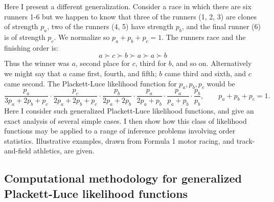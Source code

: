 \documentclass[article]{jss}
\begin{document}
Here I present a different generalization.  Consider a race in which
there are six runners 1-6 but we happen to know that three of the
runners (1, 2, 3) are clones of strength $p_a$, two of the runners (4, 5)
have strength $p_b$, and the final runner (6) is of strength $p_c$.
We normalize so $p_a+p_b+p_c=1$.  The runners race and the finishing
order is:
%
$$a\succ c\succ b\succ a\succ a \succ b$$
%
Thus the winner was $a$, second place for $c$, third for $b$, and so
on.  Alternatively we might say that $a$ came first, fourth, and
fifth; $b$ came third and sixth, and $c$ came second.  The
Plackett-Luce likelihood function for $p_a, p_b, p_c$ would be
%
\begin{equation}\label{plackettluce}
\frac{p_a}{3p_a+2p_b+p_c}\cdot
\frac{p_c}{2p_a+2p_b+p_c}\cdot
\frac{p_b}{2p_a+2p_b    }\cdot
\frac{p_a}{2p_a+ p_b    }\cdot
\frac{p_a}{ p_a+ p_b    }\cdot
\frac{p_b}{      p_b    },\qquad p_a+p_b+p_c=1.
\end{equation}
%
Here I consider such generalized Plackett-Luce likelihood functions,
and give an exact analysis of several simple cases.  I then show how
this class of likelihood functions may be applied to a range of
inference problems involving order statistics.  Illustrative examples,
drawn from Formula 1 motor racing, and track-and-field athletics, are
given.

\subsection{Computational methodology for generalized Plackett-Luce likelihood functions}
\end{document}
